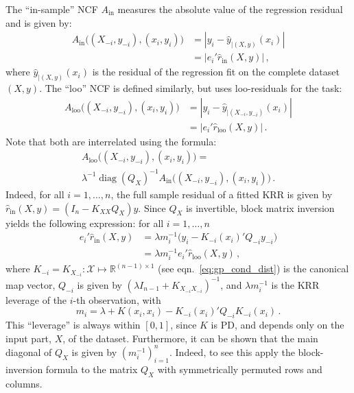 \documentclass{ITaSconf}
\newcommand{\Xcal}{\mathcal{X}}
\newcommand{\Real}{\mathbb{R}}
\newcommand{\diag}{\mathop{\text{diag}}\nolimits}
\begin{document}
The ``in-sample'' NCF $A_{\text{in}}$ measures the absolute value of the regression
residual and is given by:
\begin{align}
  A_{\text{in}}\bigl((X_{-i}, y_{-i}), (x_i, y_i)\bigr)
    &= |y_i - \hat{y}_{|(X, y)}(x_i)| \nonumber\\
    &= |e_i' \hat{r}_{\text{in}}(X, y)| \label{eq:ins_ncf}
    \,,
\end{align}
where $\hat{y}_{|(X, y)}(x_i)$ is the residual of the regression fit on the complete
dataset $(X, y)$. The ``loo'' NCF is defined similarly, but uses loo-residuals for
the task:
\begin{align*}
  A_{\text{loo}}\bigl((X_{-i}, y_{-i}), (x_i, y_i)\bigr)
    &= |y_i - \hat{y}_{|(X_{-i}, y_{-i})}(x_i)| \\
    &= |e_i' \hat{r}_{\text{loo}}(X, y)|
    \,.
\end{align*}
Note that both are interrelated using the formula:
\begin{multline*}
  A_{\text{loo}}\bigl((X_{-i}, y_{-i}), (x_i, y_i)\bigr)
    = \\ \lambda^{-1} \diag(Q_X)^{-1}
    A_{\text{in}}\bigl((X_{-i}, y_{-i}), (x_i, y_i)\bigr)
    \,.
\end{multline*}
Indeed, for all $i=1,\ldots,n$, the full sample residual of a fitted KRR is given
by $\hat{r}_{\text{in}}(X, y) = (I_n - K_{XX} Q_X) y$. Since $Q_X$ is invertible,
block matrix inversion yields the following expression: for all $i=1,\ldots, n$
\begin{align}
  e_i' \hat{r}_{\text{in}}(X, y)
  &= \lambda m_i^{-1} \bigl(y_i - K_{-i}(x_i)' Q_{-i} y_{-i} \bigr) \nonumber \\
  &= \lambda m_i^{-1} e_i' \hat{r}_{\text{loo}}(X, y) \label{eq:loo_resid} \,,
\end{align}
where $K_{-i} = K_{X_{-i}}: \Xcal \mapsto \Real^{(n-1)\times1}$ (see eqn.~\ref{eq:gp_cond_dist})
is the canonical map vector, $Q_{-i}$ is given by $(\lambda I_{n-1} + K_{X_{-i}X_{-i}})^{-1}$,
and $\lambda m_i^{-1}$ is the KRR leverage of the $i$-th observation, with
\begin{equation*}
  m_i = \lambda + K(x_i, x_i) - K_{-i}(x_i)' Q_{-i} K_{-i}(x_i) \,.
\end{equation*}
This ``leverage'' is always within $[0,1]$, since $K$ is PD, and depends only on
the input part, $X$, of the dataset. Furthermore, it can be shown that the main
diagonal of $Q_X$ is given by $(m_i^{-1})_{i=1}^n$. Indeed, to see this apply the
block-inversion formula to the matrix $Q_X$ with symmetrically permuted rows and
columns.
\end{document}
